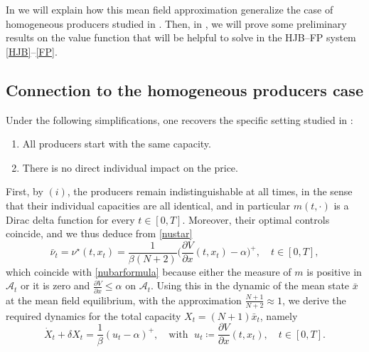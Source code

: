 \documentclass[12pt]{article}
\begin{document}
In  we will explain how this mean field approximation generalize the case of homogeneous producers studied in . Then, in , we will prove some preliminary results on the value function that will be helpful to solve in  the HJB--FP system \eqref{HJB}--\eqref{FP}. 

\subsection{Connection to the homogeneous producers case}\label{homogeneous}

Under the following simplifications, one recovers the specific setting studied in :
\begin{enumerate}\itemsep -2pt
    \item[$(i)$] All producers start with the same capacity.
    \item[$(ii)$] There is no direct individual impact on the price.
\end{enumerate}
First, by $(i)$, the producers remain indistinguishable at all times, in the sense that their individual capacities are all identical, and in particular \(m(t,\cdot)\) is a Dirac delta function for every \(t \in [0,T]\). Moreover, their optimal controls coincide, and we thus deduce from \eqref{nustar}
$$\bar{\nu}_t = \nu^\star(t,x_t) = \frac{1}{\beta(N+2)} \bigg(\dfrac{\partial V}{\partial x}(t,x_t)-\alpha \bigg)^+, \quad t \in [0,T],$$
which coincide with \eqref{nubarformula} because either the measure of $m$ is positive in $\mathcal{A}_t$ or it is zero and $\frac{\partial V}{\partial x}\leq\alpha$ on $\mathcal{A}_t$. Using this in the dynamic of the mean state $\bar{x}$ at the mean field equilibrium, with the approximation $\frac{N+1}{N+2}\approx 1$, we derive the required dynamics for the total capacity $X_t = (N+1)\bar{x}_t$, namely
\begin{equation}\label{new_2}
\dot{X}_t+\delta X_t=\frac{1}{\beta}\left(u_t-\alpha\right)^+, \quad \text{with } \; u_t \coloneq \frac{\partial V}{\partial x}(t,x_t), \quad t \in [0,T].
\end{equation}
\end{document}
